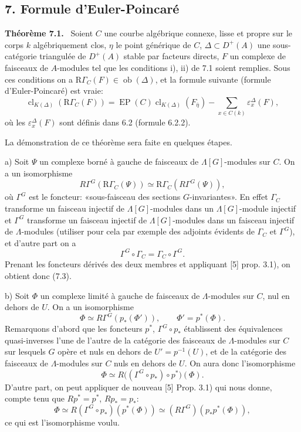 \documentclass[11pt]{article}
\newenvironment{statement}[1]{\par\medskip\noindent\textbf{#1.}\ }{\par\medskip}
\providecommand{\EP}{\operatorname{EP}}
\providecommand{\Ob}{\operatorname{ob}}
\providecommand{\Ob}{\operatorname{ob}}
\providecommand{\EP}{\operatorname{EP}}
\providecommand{\Ob}{\operatorname{Ob}}
\providecommand{\clK}[1]{\operatorname{cl}_{K(#1)}}
\providecommand{\RG}{\mathrm R\Gamma}
\begin{document}
\subsection*{7. Formule d'Euler-Poincaré}

\begin{statement}{Théorème 7.1}
Soient $C$ une courbe algébrique connexe, lisse et propre sur le corps $k$ algébriquement clos, $\eta$ le point générique de $C$, $\Delta\subset D^+(A)$ une sous-catégorie triangulée de $D^+(A)$ stable par facteurs directs, $F$ un complexe de faisceaux de $A$-modules tel que les conditions i), ii) de 7.1 soient remplies. Sous ces conditions on a $\RG_C(F)\in\Ob(\Delta)$, et la formule suivante (formule d'Euler-Poincaré) est vraie:
\[
\clK{\Delta}(\RG_C(F))
=
\EP(C)\clK{\Delta}(F_{\bar\eta})
-\sum_{x\in C(k)}\varepsilon_x^\Delta(F),
\tag{7.2}
\]
où les $\varepsilon_x^\Delta(F)$ sont définis dans 6.2 (formule 6.2.2).
\end{statement}

La démonstration de ce théorème sera faite en quelques étapes.

a) Soit $\Psi$ un complexe borné à gauche de faisceaux de $\Lambda[G]$-modules sur $C$. On a un isomorphisme
\[
R\Gamma^G(\RG_C(\Psi))\simeq\RG_C(R\Gamma^G(\Psi)),
\tag{7.3}
\]
où $\Gamma^G$ est le foncteur: «sous-faisceau des sections $G$-invariantes». En effet $\Gamma_C$ transforme un faisceau injectif de $\Lambda[G]$-modules dans un $\Lambda[G]$-module injectif et $\Gamma^G$ transforme un faisceau injectif de $\Lambda[G]$-modules dans un faisceau injectif de $\Lambda$-modules (utiliser pour cela par exemple des adjoints évidents de $\Gamma_C$ et $\Gamma^G$), et d'autre part on a
\[
\Gamma^G\circ\Gamma_C=\Gamma_C\circ\Gamma^G.
\]
Prenant les foncteurs dérivés des deux membres et appliquant [5] prop. 3.1), on obtient donc (7.3).

b) Soit $\Phi$ un complexe limité à gauche de faisceaux de $\Lambda$-modules sur $C$, nul en dehors de $U$. On a un isomorphisme
\[
\Phi\simeq R\Gamma^G(p_*(\Phi')),
\qquad \Phi'=p^*(\Phi).
\tag{7.4}
\]
Remarquons d'abord que les foncteurs $p^*$, $\Gamma^G\circ p_*$ établissent des équivalences quasi-inverses l'une de l'autre de la catégorie des faisceaux de $\Lambda$-modules sur $C$ sur lesquels $G$ opère et nuls en dehors de $U'=p^{-1}(U)$, et de la catégorie des faisceaux de $\Lambda$-modules sur $C$ nuls en dehors de $U$. On aura donc l'isomorphisme
\[
\Phi\simeq R\bigl((\Gamma^G\circ p_*)\circ p^*\bigr)(\Phi).
\]
D'autre part, on peut appliquer de nouveau [5] Prop. 3.1) qui nous donne, compte tenu que $Rp^*=p^*$, $Rp_*=p_*$:
\[
\Phi\simeq R(\Gamma^G\circ p_*)(p^*(\Phi))
\simeq (R\Gamma^G)(p_*p^*(\Phi)),
\]
ce qui est l'isomorphisme voulu.
\end{document}
